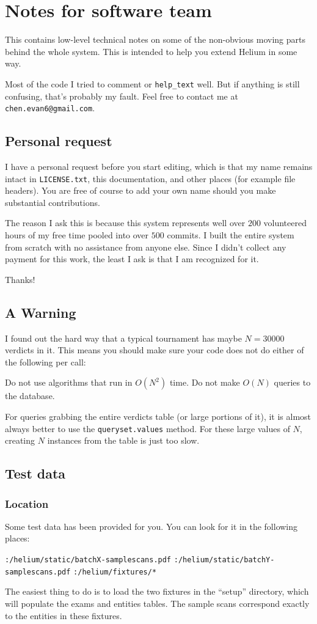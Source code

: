 \chapter{Notes for software team}
This contains low-level technical notes on some of the non-obvious
moving parts behind the whole system.
This is intended to help you extend Helium in some way.

Most of the code I tried to comment or \verb+help_text+ well.
But if anything is still confusing, that's probably my fault.
Feel free to contact me at \texttt{chen.evan6@gmail.com}.

\section{Personal request}
I have a personal request before you start editing,
which is that my name remains intact in \texttt{LICENSE.txt},
this documentation, and other places (for example file headers).
You are free of course to add your own name
should you make substantial contributions.

The reason I ask this is because this system represents
well over $200$ volunteered hours of my free time
pooled into over $500$ commits.
I built the entire system from scratch with no assistance from anyone else.
Since I didn't collect any payment for this work,
the least I ask is that I am recognized for it.

Thanks!

\section{A Warning}
I found out the hard way that a typical tournament has maybe $N = 30000$ verdicts in it.
This means you should make sure your code does not do either of the following per call:
\begin{itemize}
	\ii Do not use algorithms that run in $O(N^2)$ time.
	\ii Do not make $O(N)$ queries to the database.
\end{itemize}
For queries grabbing the entire verdicts table (or large portions of it),
it is almost always better to use the \texttt{queryset.values} method.
For these large values of $N$, creating $N$ instances from the table is just too slow.

\section{Test data}
\subsection{Location}
Some test data has been provided for you.
You can look for it in the following places:
\begin{itemize}
	\ii \verb+:/helium/static/batchX-samplescans.pdf+
	\ii \verb+:/helium/static/batchY-samplescans.pdf+
	\ii \verb+:/helium/fixtures/*+
\end{itemize}
The easiest thing to do is to load the two fixtures in the ``setup'' directory,
which will populate the exams and entities tables.
The sample scans correspond exactly to the entities in these fixtures.

